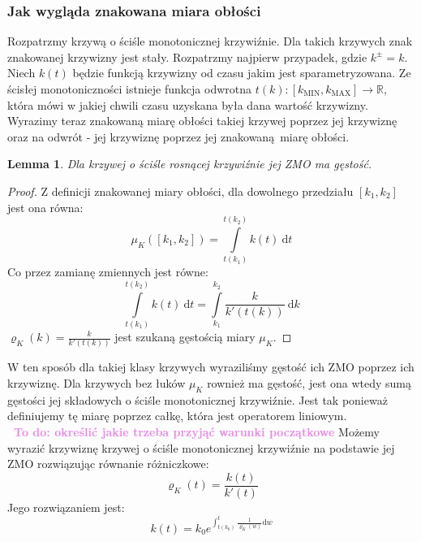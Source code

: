 \documentclass[a4paper, 12pt]{article}
\newtheorem{lemma}[observation]{Lemma}
\newcommand{\smalltodoII}[1]{\hfill \break \textbf{\ \textcolor{violet}{To do: #1}}\hfill \break}
\begin{document}
\subsubsection{Jak wygląda znakowana miara obłości}
Rozpatrzmy krzywą o ściśle monotonicznej krzywiźnie.
Dla takich krzywych znak znakowanej krzywizny jest stały. Rozpatrzmy najpierw przypadek, gdzie $k^\pm = k$.
\\
 Niech $k(t)$ będzie funkcją krzywizny od czasu jakim
jest
sparametryzowana. Ze ścisłej monotoniczności istnieje funkcja odwrotna $t(k) : [k_\text{MIN}, k_\text{MAX}]
\to \mathbb{R}$, która mówi w jakiej chwili czasu uzyskana była dana wartość krzywizny. \\
Wyrazimy teraz znakowaną miarę obłości takiej krzywej poprzez jej krzywiznę oraz na odwrót - jej krzywiznę
poprzez jej znakowaną miarę obłości. \\
\begin{lemma}
    Dla krzywej o ściśle rosnącej krzywiźnie jej ZMO ma gęstość.
\end{lemma}
\begin{proof}
    Z definicji znakowanej miary obłości, dla dowolnego przedziału $[k_1, k_2]$ jest ona równa:
    \begin{equation}
        \mu_K([k_1, k_2]) = \displaystyle\int\limits_{t(k_1)}^{t(k_2)}k(t)\ \text{d}t
    \end{equation}
    Co przez zamianę zmiennych jest równe:
    \begin{equation}
        \displaystyle\int\limits_{t(k_1)}^{t(k_2)}k(t)\ \text{d}t =
        \displaystyle\int\limits_{k_1}^{k_2}\frac{k}{k'(t(k))}\ \text{d}k
    \end{equation}
    $\varrho_K(k) = \frac{k}{k'(t(k))}$ jest szukaną gęstością miary $\mu_K$.
\end{proof}
W ten sposób dla takiej klasy krzywych wyraziliśmy gęstość ich ZMO poprzez ich krzywiznę. Dla krzywych bez
łuków $\mu_K$ rownież ma gęstość, jest ona wtedy sumą gęstości jej składowych o ściśle monotonicznej
krzywiźnie.
Jest tak ponieważ definiujemy tę miarę poprzez całkę, która jest operatorem liniowym. \\
\smalltodoII{określić jakie trzeba przyjąć warunki początkowe}
Możemy wyrazić krzywiznę krzywej o ściśle monotonicznej krzywiźnie na podstawie jej ZMO rozwiązując równanie
różniczkowe:
\begin{equation}
    \varrho_K(t) = \frac{k(t)}{k'(t)}
\end{equation}
Jego rozwiązaniem jest:
\begin{equation}
    k(t) = k_0e^{\int_{t(k_0)}^{t}\frac{1}{\varrho_K(w)}\text{d}w}
\end{equation}
\end{document}
